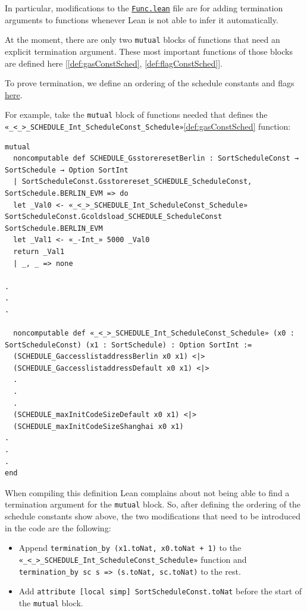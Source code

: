 In particular, modifications to the
\href{https://runtimeverification.github.io/evm-equivalence/docs/EvmEquivalence/KEVM2Lean/Func.html}{\texttt{Func.lean}}
file are for adding termination arguments to functions whenever Lean is not able
to infer it automatically.

At the moment, there are only two \texttt{mutual} blocks of functions that need
an explicit termination argument. These most important functions of those blocks
are defined here [\ref{def:gasConstSched}, \ref{def:flagConstSched}].

To prove termination, we define an ordering of the schedule constants and flags
\href{https://runtimeverification.github.io/evm-equivalence/docs/EvmEquivalence/KEVM2Lean/ScheduleOrdering.html}{here}.

For example, take the \texttt{mutual} block of functions needed that defines the \texttt{«_<_>_SCHEDULE_Int_ScheduleConst_Schedule»}\ref{def:gasConstSched} function:

\begin{verbatim}
mutual
  noncomputable def SCHEDULE_GsstoreresetBerlin : SortScheduleConst → SortSchedule → Option SortInt
  | SortScheduleConst.Gsstorereset_SCHEDULE_ScheduleConst, SortSchedule.BERLIN_EVM => do
  let _Val0 <- «_<_>_SCHEDULE_Int_ScheduleConst_Schedule» SortScheduleConst.Gcoldsload_SCHEDULE_ScheduleConst SortSchedule.BERLIN_EVM
  let _Val1 <- «_-Int_» 5000 _Val0
  return _Val1
  | _, _ => none

.
.
.

  noncomputable def «_<_>_SCHEDULE_Int_ScheduleConst_Schedule» (x0 : SortScheduleConst) (x1 : SortSchedule) : Option SortInt :=
  (SCHEDULE_GaccesslistaddressBerlin x0 x1) <|>
  (SCHEDULE_GaccesslistaddressDefault x0 x1) <|>
  .
  .
  .
  (SCHEDULE_maxInitCodeSizeDefault x0 x1) <|>
  (SCHEDULE_maxInitCodeSizeShanghai x0 x1)
.
.
.
end
\end{verbatim}

When compiling this definition Lean complains about not being able to find a termination argument for the \texttt{mutual} block.
So, after defining the ordering of the schedule constants show above, the two modifications that need to be introduced in the code are the following:

\begin{itemize}
\item Append \texttt{termination_by (x1.toNat, x0.toNat + 1)} to the \texttt{«_<_>_SCHEDULE_Int_ScheduleConst_Schedule»} function and \texttt{termination_by sc s => (s.toNat, sc.toNat)} to the rest.
\item Add \texttt{attribute [local simp] SortScheduleConst.toNat} before the start of the \texttt{mutual} block.
\end{itemize}

